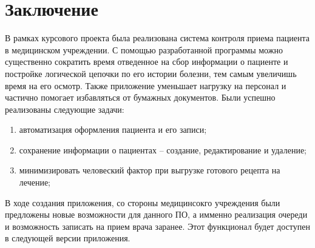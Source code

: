 \documentclass[a4paper, 10pt]{article}
\begin{document}
	\section*{Заключение}
	\hspace*{5mm}В рамках курсового проекта была реализована система контроля приема пациента в медицинском учреждении. С помощью разработанной программы можно существенно сократить время отведенное на сбор информации о пациенте и постройке логической цепочки по его истории болезни, тем самым увеличишь время на его осмотр. Также приложение уменьшает нагрузку на персонал и частично помогает избавляться от бумажных документов.  
	Были успешно реализованы следующие задачи:
	\begin{enumerate}
		\item автоматизация оформления пациента и его записи;
		\item сохранение информации о пациентах – создание, редактирование и удаление;
		\item минимизировать человеский фактор при выгрузке готового рецепта на лечение;
	\end{enumerate}
	В ходе создания приложения, со стороны медицинсокго учреждения были предложены новые возможности для данного ПО, а имменно реализация очереди и возможность записать на прием врача заранее. Этот функционал будет доступен в следующей версии приложения. 
	   

\clearpage
\newpage

\printbibliography
{}
\end{document}
